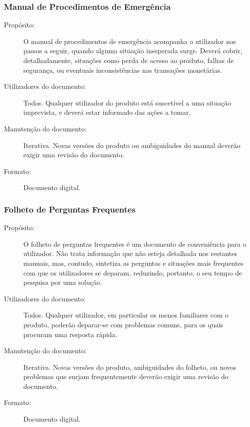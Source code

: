 \documentclass[12pt,a4paper]{article}
\begin{document}
    \subsubsection{Manual de Procedimentos de Emergência}
      \begin{description}
        \item[Propósito:]O manual de procedimentos de emergência acompanha o utilizador nos passos a seguir, quando alguma situação inesperada surge. Deverá cobrir, detalhadamente, situações como perda de acesso ao produto, falhas de segurança, ou eventuais inconsistências nas transações monetárias.
        \item[Utilizadores do documento:]Todos. Qualquer utilizador do produto está suscetível a uma situação imprevista, e deverá estar informado das ações a tomar.
        \item[Manutenção do documento:]Iterativa. Novas versões do produto ou ambiguidades do manual deverão exigir uma revisão do documento.
        \item[Formato:]Documento digital.
      \end{description}

    \subsubsection{Folheto de Perguntas Frequentes}
      \begin{description}
        \item[Propósito:]O folheto de perguntas frequentes é um documento de conveniência para o utilizador. Não trata informação que não esteja detalhada nos restantes manuais, mas, contudo, sintetiza as perguntas e situações mais frequentes com que os utilizadores se deparam, reduzindo, portanto, o seu tempo de pesquisa por uma solução.
        \item[Utilizadores do documento:]Todos. Qualquer utilizador, em particular os menos familiares com o produto, poderão deparar-se com problemas comuns, para os quais procuram uma resposta rápida.
        \item[Manutenção do documento:]Iterativa. Novas versões do produto, ambiguidades do folheto, ou novos problemas que surjam frequentemente deverão exigir uma revisão do documento.
        \item[Formato:]Documento digital.
      \end{description}
\end{document}

